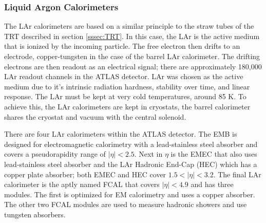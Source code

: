 		\subsubsection{Liquid Argon Calorimeters}\label{sssec:LAr}
			The \gls{LAr} calorimeters are based on a similar principle to the straw tubes of the \gls{TRT} described in section \ref{sssec:TRT}. In this case, the \gls{LAr} is the active medium that is ionized by the incoming particle. The free electron then drifts to an electrode, copper-tungsten in the case of the barrel \gls{LAr} calorimeter. The drifting electrons are then readout as an electrical signal; there are approximately 180,000 \gls{LAr} readout channels in the \gls{ATLAS} detector. \gls{LAr} was chosen as the active medium due to it's intrinsic radiation hardness, stability over time, and linear response. The \gls{LAr} must be kept at very cold temperatures, around 85 K. To achieve this, the \gls{LAr} calorimeters are kept in cryostats, the barrel calorimeter shares the cryostat and vacuum with the central solenoid.

			There are four \gls{LAr} calorimeters within the \gls{ATLAS} detector. The \gls{EMB} is designed for electromagnetic calorimetry with a lead-stainless steel absorber and covers a pseudorapidity range of $|\eta|<2.5$. Next in $\eta$ is the \gls{EMEC} that also uses lead-stainless steel absorber and the \gls{LAr} Hadronic End-Cap (HEC) which has a copper plate absorber; both \gls{EMEC} and \gls{HEC} cover $1.5 < |\eta| < 3.2$. The final \gls{LAr} calorimeter is the aptly named \gls{FCAL} that covers $|\eta|<4.9$ and has three modules. The first is optimized for \gls{EM} calorimetry and uses a copper absorber. The other two \gls{FCAL} modules are used to measure hadronic showers and use tungsten absorbers.


